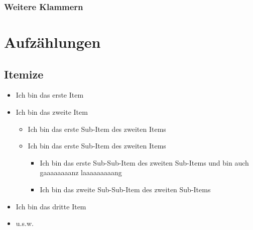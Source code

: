 \documentclass[rgb]{beamer}
\begin{document}
\begin{frame}[t]
\frametitle{Weitere Klammern}
\vskip 18pt
\begin{minipage}{0.245\textwidth}
\cdbracket[mode=left]{2cm}{8cm}
\end{minipage}%
\begin{minipage}{0.5\textwidth}
\centering\cdbracket[thick=4pt, mode=top, arrowleft=true, arrowright=true]{8cm}{2cm}
\end{minipage}%
\begin{minipage}{0.245\textwidth}
\hfill\cdbracket[mode=right]{2cm}{8cm}
\end{minipage}%

\end{frame}



\section{Aufzählungen}
\subsection{Itemize}

\begin{frame}[t]
\sectionpage
\subsectionpage
	\begin{itemize}
		\item Ich bin das erste Item
		\item Ich bin das zweite Item
		\begin{itemize}
			\item Ich bin das erste Sub-Item des zweiten Items
			\item Ich bin das erste Sub-Item des zweiten Items
			\begin{itemize}
				\item Ich bin das erste Sub-Sub-Item des zweiten Sub-Items und bin auch gaaaaaaaanz laaaaaaaaang
				\item Ich bin das zweite Sub-Sub-Item des zweiten Sub-Items
			\end{itemize}
		\end{itemize}
	\item Ich bin das dritte Item
	\item u.s.w.
\end{itemize}
\end{frame}
\end{document}
